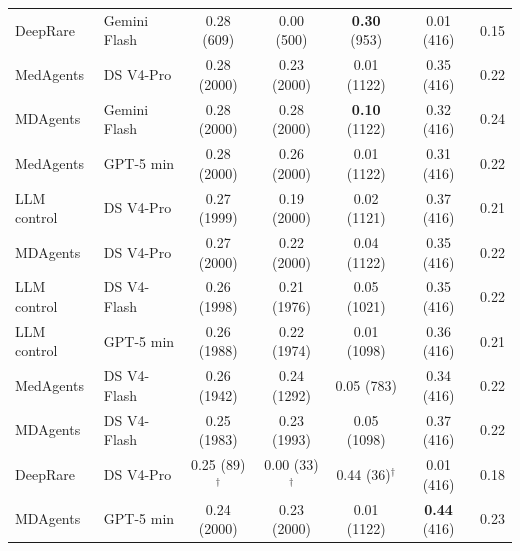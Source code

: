 \documentclass[letterpaper]{article} %
\begin{document}
\begin{table}[t]
\begin{tabular}{@{}llccccc@{}}
DeepRare  &  Gemini Flash  &  \cellcolor{heatB}0.28 (609) & \cellcolor{heatE}0.00 (500) & \cellcolor{heatC}\textbf{0.30} (953) & \cellcolor{heatE}0.01 (416) & \cellcolor{heatA}0.15  \\
MedAgents  &  DS V4-Pro  &  \cellcolor{heatB}0.28 (2000) & \cellcolor{heatB}0.23 (2000) & \cellcolor{heatE}0.01 (1122) & \cellcolor{heatC}0.35 (416) & \cellcolor{heatB}0.22  \\
MDAgents  &  Gemini Flash  &  \cellcolor{heatB}0.28 (2000) & \cellcolor{heatB}0.28 (2000) & \cellcolor{heatA}\textbf{0.10} (1122) & \cellcolor{heatC}0.32 (416) & \cellcolor{heatB}0.24  \\
MedAgents  &  GPT-5 min  &  \cellcolor{heatB}0.28 (2000) & \cellcolor{heatB}0.26 (2000) & \cellcolor{heatE}0.01 (1122) & \cellcolor{heatC}0.31 (416) & \cellcolor{heatB}0.22  \\
LLM control  &  DS V4-Pro  &  \cellcolor{heatB}0.27 (1999) & \cellcolor{heatA}0.19 (2000) & \cellcolor{heatE}0.02 (1121) & \cellcolor{heatC}0.37 (416) & \cellcolor{heatB}0.21  \\
MDAgents  &  DS V4-Pro  &  \cellcolor{heatB}0.27 (2000) & \cellcolor{heatB}0.22 (2000) & \cellcolor{heatE}0.04 (1122) & \cellcolor{heatC}0.35 (416) & \cellcolor{heatB}0.22  \\
LLM control  &  DS V4-Flash  &  \cellcolor{heatB}0.26 (1998) & \cellcolor{heatB}0.21 (1976) & \cellcolor{heatE}0.05 (1021) & \cellcolor{heatC}0.35 (416) & \cellcolor{heatB}0.22  \\
LLM control  &  GPT-5 min  &  \cellcolor{heatB}0.26 (1988) & \cellcolor{heatB}0.22 (1974) & \cellcolor{heatE}0.01 (1098) & \cellcolor{heatC}0.36 (416) & \cellcolor{heatB}0.21  \\
MedAgents  &  DS V4-Flash  &  \cellcolor{heatB}0.26 (1942) & \cellcolor{heatB}0.24 (1292) & \cellcolor{heatE}0.05 (783) & \cellcolor{heatC}0.34 (416) & \cellcolor{heatB}0.22  \\
MDAgents  &  DS V4-Flash  &  \cellcolor{heatB}0.25 (1983) & \cellcolor{heatB}0.23 (1993) & \cellcolor{heatE}0.05 (1098) & \cellcolor{heatC}0.37 (416) & \cellcolor{heatB}0.22  \\
DeepRare  &  DS V4-Pro  &  \cellcolor{heatB}0.25 (89)$^{\dagger}$ & \cellcolor{heatE}0.00 (33)$^{\dagger}$ & \cellcolor{heatD}0.44 (36)$^{\dagger}$ & \cellcolor{heatE}0.01 (416) & \cellcolor{heatA}0.18  \\
MDAgents  &  GPT-5 min  &  \cellcolor{heatB}0.24 (2000) & \cellcolor{heatB}0.23 (2000) & \cellcolor{heatE}0.01 (1122) & \cellcolor{heatD}\textbf{0.44} (416) & \cellcolor{heatB}0.23  \\

\end{tabular}
\end{table}
\end{document}
